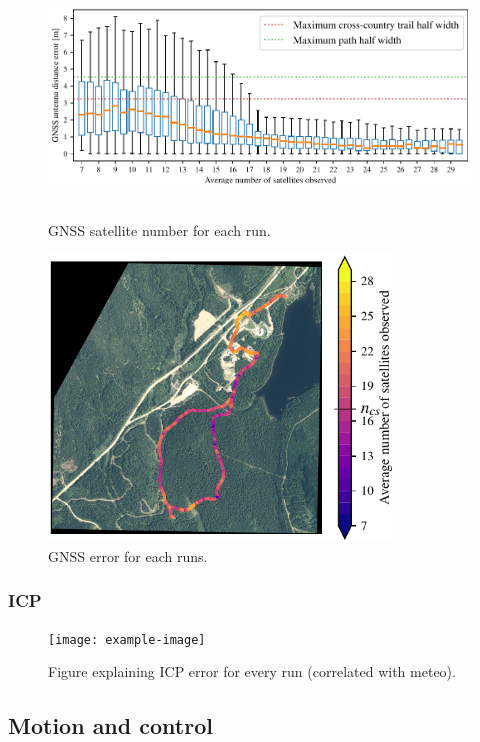 \begin{figure} [htpb]
	\centering
	\includegraphics[height=2.5in]{./figs/GPS/GNSS_numsatvserr.pdf}
	\caption{GNSS satellite number for each run.}
	\label{fig:gnss_satellite_number}
\end{figure}

\begin{figure}
	\centering
	\includegraphics[height=3.0in]{./figs/GPS/GNSS_numsatimg.pdf}
	\caption{GNSS error for each runs.}
	\label{fig:gnss_run_error}
\end{figure}


\subsubsection{ICP}
\label{sec:ICP}

\lightlipsum[1]

\begin{figure} [htpb]
	\centering
	\texttt{[image: example-image]}
	\caption{Figure explaining ICP error for every run (correlated with meteo).}
	\label{fig:icp_error}
\end{figure}



\subsection{Motion and control}
\label{sec:res_motion}

